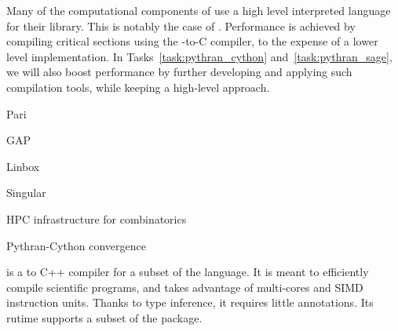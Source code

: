 \begin{Workpackage}{\thewpno}
\begin{WPDescription}

  Many of the computational components of \TheProject use a high level
  interpreted language for their library. This is notably the case of
  \Sage. Performance is achieved by compiling critical sections using
  the \Cython \Python-to-C compiler, to the expense of a lower level
  implementation. In Tasks~\ref{task:pythran_cython}
  and~\ref{task:pythran_sage}, we will also boost performance by
  further developing and applying such compilation tools, while
  keeping a high-level approach.

\end{WPDescription}

\begin{task}{Pari}
  \label{task:hpc_pari}

\end{task}

\begin{task}{GAP}
  \label{task:hpc_gap}

\end{task}

\begin{task}{Linbox}
  \label{task:hpc_linbox}

\end{task}

\begin{task}{Singular}
  \label{task:hpc_singular}

\end{task}


\begin{task}{HPC infrastructure for combinatorics}
\end{task}

\begin{task}{Pythran-Cython convergence}
  \label{task:pythran_cython}

  \Pythran is a \Python to C++ compiler for a subset of the \Python
  language. It is meant to efficiently compile scientific programs,
  and takes advantage of multi-cores and SIMD instruction units.
  Thanks to type inference, it requires little annotations. Its rutime
  supports a subset of the \Numpy package.


\end{task}
\end{Workpackage}
